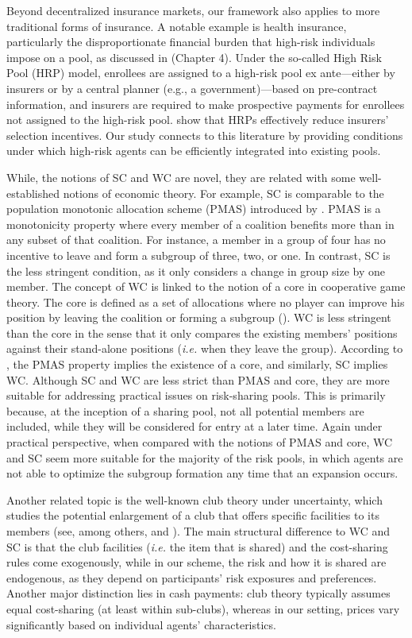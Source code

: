 \documentclass[fleqn,mnsc,nonblindrev]{informs4}
\begin{document}
Beyond decentralized insurance markets, our framework also applies to more traditional forms of insurance. A notable example is health insurance, particularly the disproportionate financial burden that high-risk individuals impose on a pool, as discussed in \cite{mcguire2018risk} (Chapter 4). Under the so-called High Risk Pool (HRP) model, enrollees are assigned to a high-risk pool ex ante—either by insurers or by a central planner (e.g., a government)—based on pre-contract information, and insurers are required to make prospective payments for enrollees not assigned to the high-risk pool. \cite{geruso2016} show that HRPs effectively reduce insurers’ selection incentives. Our study connects to this literature by providing conditions under which high-risk agents can be efficiently integrated into existing pools.

While, the notions of SC and WC are novel, they are related with some well-established notions of economic theory. For example, SC is comparable to the population monotonic allocation scheme (PMAS) introduced by \cite{sprumont1990population}. PMAS is a monotonicity property where every member of a coalition benefits more than in any subset of that coalition. For instance, a member in a group of four has no incentive to leave and form a subgroup of three, two, or one. In contrast, SC is the less stringent condition, as it only considers a change in group size by one member. The concept of WC is linked to the notion of a core in cooperative game theory. The core is defined as a set of allocations where no player can improve his position by leaving the coalition or forming a subgroup (\cite{driessen1991survey}). WC is less stringent than the core in the sense that it only compares the existing members' positions against their stand-alone positions (\textit{i.e.} when they leave the group). According to \cite{chen2019population}, the PMAS property implies the existence of a core, and similarly, SC implies WC. Although SC and WC are less strict than PMAS and core, they are more suitable for addressing practical issues on risk-sharing pools. This is primarily because, at the inception of a sharing pool, not all potential members are included, while they will be considered for entry at a later time.    {Again under practical perspective, when compared with the notions of PMAS and core, WC and SC seem more suitable for the majority of the risk pools, in which agents are not able to optimize the subgroup formation any time that an expansion occurs.}

   {Another related topic is the well-known club theory under uncertainty, which studies the potential enlargement of a club that offers specific facilities to its members (see, among others, \cite{SandTsch97} and \cite{SandSteTsch85}). The main structural difference to WC and SC is that the club facilities (\textit{i.e.} the item that is shared) and the cost-sharing rules come exogenously, while in our scheme, the risk and how it is shared are endogenous, as they depend on participants’ risk exposures and preferences. Another major distinction lies in cash payments: club theory typically
assumes equal cost-sharing (at least within sub-clubs), whereas in our setting, prices vary significantly
based on individual agents’ characteristics.}
\end{document}

